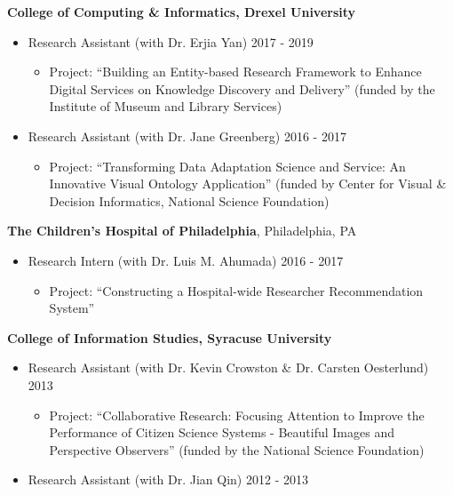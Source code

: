 \documentclass[margin, 10pt]{res} %
\begin{document}
\begin{resume}
\textbf{College of Computing \& Informatics, Drexel University}\\
\begin{itemize}
     \item Research Assistant (with Dr. Erjia Yan) \hfill 2017 - 2019
     \begin{itemize}
     	\item  Project: “Building an Entity-based Research Framework to Enhance Digital Services on Knowledge Discovery and Delivery” (funded by the Institute of Museum and Library Services)
   	\end{itemize}
   	\item Research Assistant (with Dr. Jane Greenberg) \hfill 2016 - 2017
     \begin{itemize}
     	\item  Project: “Transforming Data Adaptation Science and Service: An Innovative Visual Ontology Application” (funded by Center for Visual \& Decision Informatics, National Science Foundation)
   	\end{itemize}
\end{itemize}

\textbf{The Children's Hospital of Philadelphia}, Philadelphia, PA\\
\begin{itemize}
     \item Research Intern (with Dr. Luis M. Ahumada) \hfill 2016 - 2017
     \begin{itemize}
     	\item  Project: “Constructing a Hospital-wide Researcher Recommendation System”
   	\end{itemize}
\end{itemize}

\textbf{College of Information Studies, Syracuse University}\\
\begin{itemize}
	\item Research Assistant (with Dr. Kevin Crowston \& Dr. Carsten Oesterlund) \hfill 2013
    \begin{itemize}
     	\item Project: “Collaborative Research: Focusing Attention to Improve the Performance of Citizen Science Systems - Beautiful Images and Perspective Observers” (funded by the National Science Foundation)
    \end{itemize}
    \item Research Assistant (with Dr. Jian Qin) \hfill 2012 - 2013
\end{itemize}


\end{resume}
\end{document}
